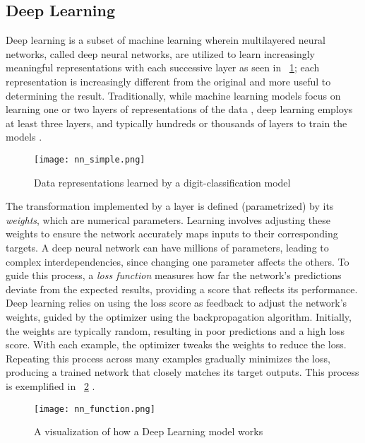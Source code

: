 \documentclass[licencjacka,en]{pracamgr}
\begin{document}
\subsection{Deep Learning}
Deep learning is a subset of machine learning wherein multilayered neural networks, called deep neural networks, are utilized to learn increasingly meaningful representations with each successive layer as seen in ~\ref{fig:nn_simple}; each representation is increasingly different from the original and more useful to determining the result. Traditionally, while machine learning models focus on learning one or two layers of representations of the data \cite{francuz_8}, deep learning employs at least three layers, and typically hundreds or thousands of layers to train the models \cite{ibm_dl}.

\begin{figure}
    \centering
    \texttt{[image: nn\_simple.png]}
    \caption{Data representations learned by a digit-classification model \cite{francuz_8}}
    \label{fig:nn_simple}
\end{figure}

The transformation implemented by a layer is defined (parametrized) by its \textit{weights}, which are numerical parameters. Learning involves adjusting these weights to ensure the network accurately maps inputs to their corresponding targets. A deep neural network can have millions of parameters, leading to complex interdependencies, since changing one parameter affects the others. To guide this process, a \textit{loss function} measures how far the network's predictions deviate from the expected results, providing a score that reflects its performance. Deep learning relies on using the loss score as feedback to adjust the network's weights, guided by the optimizer using the backpropagation algorithm. Initially, the weights are typically random, resulting in poor predictions and a high loss score. With each example, the optimizer tweaks the weights to reduce the loss. Repeating this process across many examples gradually minimizes the loss, producing a trained network that closely matches its target outputs. This process is exemplified in ~\ref{fig:nn_function} \cite{francuz_9}.

\begin{figure}
    \centering
    \texttt{[image: nn\_function.png]}
    \caption{A visualization of how a Deep Learning model works \cite{francuz_9}}
    \label{fig:nn_function}
\end{figure}
\end{document}
